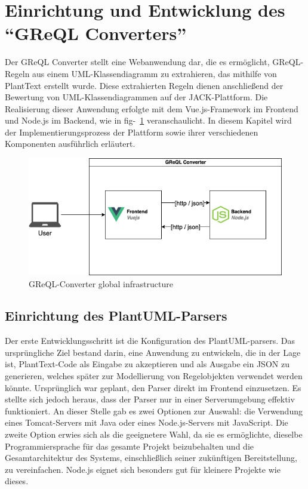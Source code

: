 \section{Einrichtung und Entwicklung des ``\gls{GReQL Converter}s''}\label{sec:greql-converter}

Der \gls{GReQL Converter} stellt eine Webanwendung dar, die es ermöglicht, GReQL-Regeln aus einem UML-Klassendiagramm zu
extrahieren, das mithilfe von PlantText erstellt wurde. Diese extrahierten Regeln dienen anschließend der Bewertung
von UML-Klassendiagrammen auf der JACK-Plattform. Die Realisierung dieser Anwendung erfolgte mit dem Vue.js-Framework
im Frontend und Node.js im Backend, wie in fig-~\ref{fig:infrastructure} veranschaulicht. In diesem Kapitel wird der
Implementierungsprozess der Plattform sowie ihrer verschiedenen Komponenten ausführlich erläutert.

\begin{figure}[h!]
    \centering
    \includegraphics[width=15cm]{images/infrastucture}
    \caption{GReQL-Converter global infrastructure}
    \label{fig:infrastructure}
\end{figure}

\subsection{Einrichtung des PlantUML-Parsers}\label{subsec:einrichtung-des-plantuml-parsers}

Der erste Entwicklungsschritt ist die Konfiguration des PlantUML-parsers. Das ursprüngliche Ziel bestand
darin, eine Anwendung zu entwickeln, die in der Lage ist, PlantText-Code als Eingabe zu akzeptieren und als Ausgabe ein
JSON zu generieren, welches später zur Modellierung von Regelobjekten verwendet werden könnte. Ursprünglich war geplant,
den Parser direkt im Frontend einzusetzen. Es stellte sich jedoch heraus, dass der Parser nur in einer Serverumgebung
effektiv funktioniert. An dieser Stelle gab es zwei Optionen zur Auswahl: die Verwendung eines Tomcat-Servers mit Java
oder eines Node.js-Servers mit JavaScript. Die zweite Option erwies sich als die geeignetere Wahl, da sie es ermöglichte,
dieselbe Programmiersprache für das gesamte Projekt beizubehalten und die Gesamtarchitektur des Systems, einschließlich
seiner zukünftigen Bereitstellung, zu vereinfachen. Node.js eignet sich besonders gut für kleinere Projekte wie dieses.

